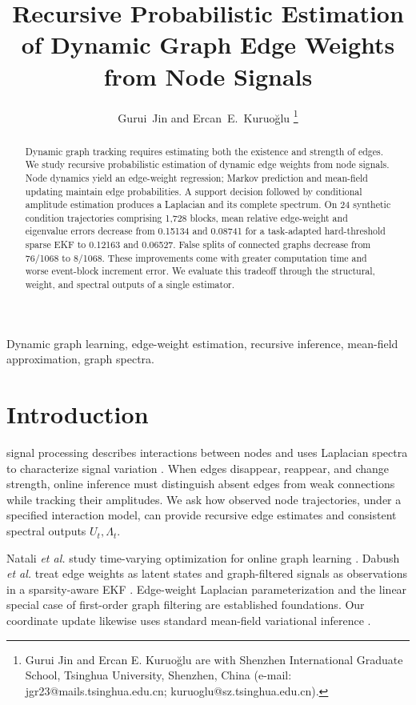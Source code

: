 \documentclass[journal]{IEEEtran}
\begin{document}
\title{Recursive Probabilistic Estimation of Dynamic Graph Edge Weights from Node Signals}
\author{Gurui~Jin and Ercan~E.~Kuruo\u{g}lu%
\thanks{Gurui Jin and Ercan E. Kuruo\u{g}lu are with Shenzhen International Graduate School, Tsinghua University, Shenzhen, China (e-mail: jgr23@mails.tsinghua.edu.cn; kuruoglu@sz.tsinghua.edu.cn).}}
\maketitle
\begin{abstract}
Dynamic graph tracking requires estimating both the existence and strength of edges. We study recursive probabilistic estimation of dynamic edge weights from node signals. Node dynamics yield an edge-weight regression; Markov prediction and mean-field updating maintain edge probabilities. A support decision followed by conditional amplitude estimation produces a Laplacian and its complete spectrum. On 24 synthetic condition trajectories comprising 1,728 blocks, mean relative edge-weight and eigenvalue errors decrease from 0.15134 and 0.08741 for a task-adapted hard-threshold sparse EKF to 0.12163 and 0.06527. False splits of connected graphs decrease from 76/1068 to 8/1068. These improvements come with greater computation time and worse event-block increment error. We evaluate this tradeoff through the structural, weight, and spectral outputs of a single estimator.
\end{abstract}
\begin{IEEEkeywords}
Dynamic graph learning, edge-weight estimation, recursive inference, mean-field approximation, graph spectra.
\end{IEEEkeywords}
\section{Introduction}
 signal processing describes interactions between nodes and uses Laplacian spectra to characterize signal variation \cite{shuman}. When edges disappear, reappear, and change strength, online inference must distinguish absent edges from weak connections while tracking their amplitudes. We ask how observed node trajectories, under a specified interaction model, can provide recursive edge estimates and consistent spectral outputs $U_t,\Lambda_t$.

Natali \emph{et al.} study time-varying optimization for online graph learning \cite{natali}. Dabush \emph{et al.} treat edge weights as latent states and graph-filtered signals as observations in a sparsity-aware EKF \cite{dabush}. Edge-weight Laplacian parameterization and the linear special case of first-order graph filtering are established foundations. Our coordinate update likewise uses standard mean-field variational inference \cite{blei}.
\end{document}
